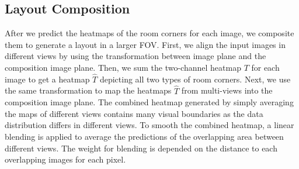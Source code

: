 




\subsection{Layout Composition}
\label{sec:merging}
After we predict the heatmaps of the room corners for each image, we composite them to generate a layout in a larger FOV. 
First, we align the input images in different views by using the transformation between image plane and the composition image plane. 
Then, we sum the two-channel heatmap $T$ for each image to get a heatmap $\hat{T}$ depicting all two types of room corners. 
Next, we use the same transformation to map the heatmaps $\hat{T}$ from multi-views into the composition image plane.
%
The combined heatmap generated by simply averaging the maps of different views contains many visual boundaries as the data distribution differs in different views. To smooth the combined heatmap, a linear blending is applied to average the predictions of the overlapping area between different views. The weight for blending is depended on the distance to each overlapping images for each pixel.

